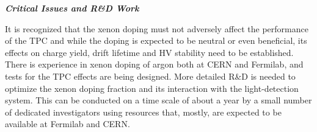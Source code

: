 
{\it\bf Critical Issues and R\&D Work}

It is recognized that the xenon doping must not adversely affect the performance of the TPC and while the doping is expected to be neutral or even beneficial, its effects on charge yield, drift lifetime and HV stability need to be established.  There is experience in xenon doping of argon both at CERN and Fermilab, and tests for the TPC effects are being designed.  
More detailed R\&D is needed to optimize the xenon doping fraction and its interaction with the light-detection system. This can be conducted on a time scale of about a year by a small number of dedicated investigators using resources that, mostly, are expected to be available at Fermilab and CERN. 

